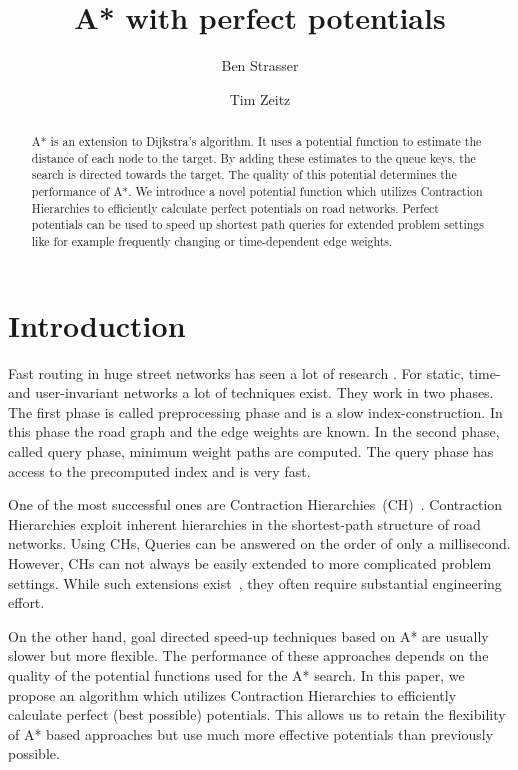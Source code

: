 \documentclass[a4paper,UKenglish,cleveref, autoref]{lipics-v2019}
\title{A* with perfect potentials} %
\author{Ben Strasser}{Dummy University Computing Laboratory, [optional: Address], Country \and My second affiliation, Country \and \url{http://www.myhomepage.edu} }{johnqpublic@dummyuni.org}{https://orcid.org/0000-0002-1825-0097}{(Optional) author-specific funding acknowledgements}%
\author{Tim Zeitz}{Institute of Theoretical Informatics, Algorithmics I, Karlsruhe Institute of Technology, Germany}{tim.zeitz@kit.edu}{}{}
\begin{document}
\maketitle

\begin{abstract}
A* is an extension to Dijkstra's algorithm.
It uses a potential function to estimate the distance of each node to the target.
By adding these estimates to the queue keys, the search is directed towards the target.
The quality of this potential determines the performance of A*.
We introduce a novel potential function which utilizes Contraction Hierarchies to efficiently calculate perfect potentials on road networks.
Perfect potentials can be used to speed up shortest path queries for extended problem settings like for example frequently changing or time-dependent edge weights.
\end{abstract}

\section{Introduction}
\label{sec:intro}

Fast routing in huge street networks has seen a lot of research \cite{Survey}.
For static, time- and user-invariant networks a lot of techniques exist.
They work in two phases.
The first phase is called preprocessing phase and is a slow index-construction.
In this phase the road graph and the edge weights are known.
In the second phase, called query phase, minimum weight paths are computed.
The query phase has access to the precomputed index and is very fast.

One of the most successful ones are Contraction Hierarchies~(CH)~\cite{CH}.
Contraction Hierarchies exploit inherent hierarchies in the shortest-path structure of road networks.
Using CHs, Queries can be answered on the order of only a millisecond.
However, CHs can not always be easily extended to more complicated problem settings.
While such extensions exist~\cite{CCH,KaTCH}, they often require substantial engineering effort.

On the other hand, goal directed speed-up techniques based on A* are usually slower but more flexible.
The performance of these approaches depends on the quality of the potential functions used for the A* search.
In this paper, we propose an algorithm which utilizes Contraction Hierarchies to efficiently calculate perfect (best possible) potentials.
This allows us to retain the flexibility of A* based approaches but use much more effective potentials than previously possible.
\end{document}
